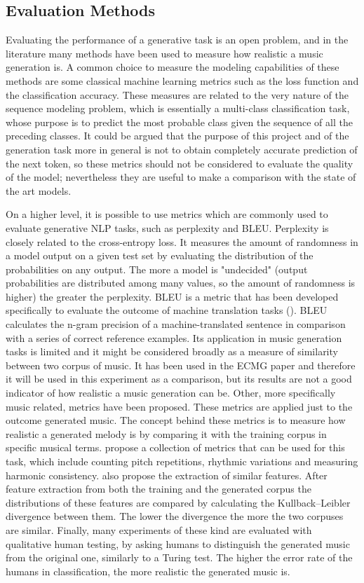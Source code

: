 \documentclass{article}
\begin{document}
\subsection{Evaluation Methods}
Evaluating the performance of a generative task is an open problem, and in the literature many methods have been used to measure how realistic a music generation is. A common choice to measure the modeling capabilities of these methods are some classical machine learning metrics such as the loss function and the classification accuracy. These measures are related to the very nature of the sequence modeling problem, which is essentially a multi-class classification task, whose purpose is to predict the most probable class given the sequence of all the preceding classes. It could be argued that the purpose of this project and of the generation task more in general is not to obtain completely accurate prediction of the next token, so these metrics should not be considered to evaluate the quality of the model; nevertheless they are useful to make a comparison with the state of the art models. 

On a higher level, it is possible to use metrics which are commonly used to evaluate generative NLP tasks, such as perplexity and BLEU. Perplexity is closely related to the cross-entropy loss. It measures the amount of randomness in a model output on a given test set by evaluating the distribution of the probabilities on any output. The more a model is "undecided" (output probabilities are distributed among many values, so the amount of randomness is higher) the greater the perplexity. BLEU is a metric that has been developed specifically to evaluate the outcome of machine translation tasks (\cite{BLEU}). BLEU calculates the n-gram precision of a machine-translated sentence in comparison with a series of correct reference examples. Its application in music generation tasks is limited and it might be considered broadly as a measure of similarity between two corpus of music. It has been used in the ECMG paper and therefore it will be used in this experiment as a comparison, but its results are not a good indicator of how realistic a music generation can be. 
Other, more specifically music related, metrics have been proposed. These metrics are applied just to the outcome generated music. The concept behind these metrics is to measure how realistic a generated melody is by comparing it with the training corpus in specific musical terms. \cite{JazzGAN} propose a collection of metrics that can be used for this task, which include counting pitch repetitions, rhythmic variations and measuring harmonic consistency. \cite{MGEval} also propose the extraction of similar features. After feature extraction from both the training and the generated corpus the distributions of these features are compared by calculating the Kullback–Leibler divergence between them. The lower the divergence the more the two corpuses are similar.
Finally, many experiments of these kind are evaluated with qualitative human testing, by asking humans to distinguish the generated music from the original one, similarly to a Turing test. The higher the error rate of the humans in classification, the more realistic the generated music is.
\end{document}
